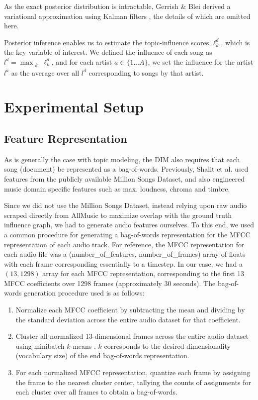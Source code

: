 As the exact posterior distribution is intractable, Gerrish \& Blei derived a variational approximation using Kalman filters \cite{gerrish2010language}, the details of which are omitted here. 

Posterior inference enables us to estimate the topic-influence scores $\ell_k^d$, which is the key variable of interest. We defined the influence of each song as $l^d = \max_{\substack{k}} \ell_k^d$, and for each artist $a \in \{1...A\}$, we set the influence for the artist $l^a$ as the average over all $l^d$ corresponding to songs by that artist. 

\section{Experimental Setup}
\subsection{Feature Representation}
As is generally the case with topic modeling, the DIM also requires that each song (document) be represented as a bag-of-words. Previously, Shalit et al. \cite{shalit2013modeling} used features from the publicly available Million Songs Dataset, and also engineered music domain specific features such as max. loudness, chroma and timbre. 

Since we did not use the Million Songs Dataset, instead relying upon raw audio scraped directly from AllMusic to maximize overlap with the ground truth influence graph, we had to generate audio features ourselves. To this end, we used a common procedure \cite{mcfee2012learning} for generating a bag-of-words representation for the MFCC representation of each audio track. For reference, the MFCC representation for each audio file was a (number\_of\_features, number\_of\_frames) array of floats with each frame corresponding essentially to a timestep. In our case, we had a $(13, 1298)$ array for each MFCC representation, corresponding to the first 13 MFCC coefficients over 1298 frames (approximately 30 seconds). The bag-of-words generation procedure used is as follows:

\begin{enumerate}
    \item Normalize each MFCC coefficient by subtracting the mean and dividing by the standard deviation across the entire audio dataset for that coefficient.
    \item Cluster all normalized 13-dimensional frames across the entire audio dataset using minibatch $k$-means \cite{sculley2010web}. $k$ corresponds to the desired dimensionality (vocabulary size) of the end bag-of-words representation.
    \item For each normalized MFCC representation, quantize each frame by assigning the frame to the nearest cluster center, tallying the counts of assignments for each cluster over all frames to obtain a bag-of-words.
\end{enumerate}

